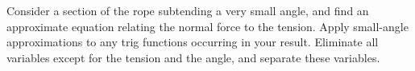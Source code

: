 Consider a section of the rope subtending a very small angle, and find
an approximate equation relating the normal force to the tension.
Apply small-angle approximations to any trig functions occurring in your
result. Eliminate all variables except for the tension and the angle,
and separate these variables.



